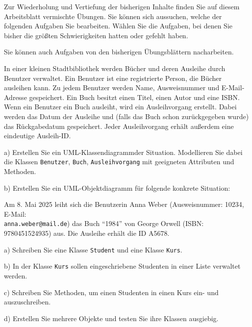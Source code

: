 \documentclass[11pt, a4paper, oneside]{article}
\begin{document}
	
	
	Zur Wiederholung und Vertiefung der bisherigen Inhalte finden Sie auf diesem Arbeitsblatt vermischte Übungen.
	Sie können sich aussuchen, welche der folgenden Aufgaben Sie bearbeiten.
	Wählen Sie die Aufgaben, bei denen Sie bisher die größten Schwierigkeiten hatten oder gefehlt haben.
	
	Sie können auch Aufgaben von den bisherigen Übungsblättern nacharbeiten.
	
	
	In einer kleinen Stadtbibliothek werden Bücher und deren Ausleihe durch Benutzer verwaltet.
	Ein Benutzer ist eine registrierte Person, die Bücher ausleihen kann.
	Zu jedem Benutzer werden Name, Ausweisnummer und E-Mail-Adresse gespeichert.
	Ein Buch besitzt einen Titel, einen Autor und eine ISBN.
	Wenn ein Benutzer ein Buch ausleiht, wird ein Ausleihvorgang erstellt.
	Dabei werden das Datum der Ausleihe und (falls das Buch schon zurückgegeben wurde) das Rückgabedatum gespeichert.
	Jeder Ausleihvorgang erhält außerdem eine eindeutige Ausleih-ID.
	
	a) Erstellen Sie ein UML-Klassendiagramm\footnotemark[1] der Situation.
	Modellieren Sie dabei die Klassen \texttt{Benutzer}, \texttt{Buch}, \texttt{Ausleihvorgang} mit geeigneten Attributen und Methoden.
	
	b) Erstellen Sie ein UML-Objektdiagramm für folgende konkrete Situation:
	
	Am 8. Mai 2025 leiht sich die Benutzerin Anna Weber (Ausweisnummer: 10234, E-Mail:\\ \texttt{anna.weber@mail.de}) das Buch ``1984'' von George Orwell (ISBN: 9780451524935) aus.
	Die Ausleihe erhält die ID A5678.
	
	
	a) Schreiben Sie eine Klasse \texttt{Student} und eine Klasse \texttt{Kurs}.
	
	b) In der Klasse \texttt{Kurs} sollen eingeschriebene Studenten in einer Liste verwaltet werden.
	
	c) Schreiben Sie Methoden, um einen Studenten in einen Kurs ein- und auszuschreiben.
	
	d) Erstellen Sie mehrere Objekte und testen Sie ihre Klassen ausgiebig.
	
	\pagebreak
	
	
\end{document}
